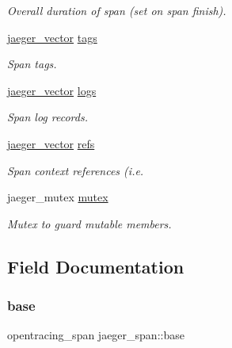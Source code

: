 \begin{DoxyCompactItemize}
\begin{DoxyCompactList}\small\item\em Overall duration of span (set on span finish). \end{DoxyCompactList}\item 
\mbox{\hyperlink{structjaeger__vector}{jaeger\+\_\+vector}} \mbox{\hyperlink{structjaeger__span_ae3812e107e701876ca824427ebdddbde}{tags}}
\begin{DoxyCompactList}\small\item\em Span tags. \end{DoxyCompactList}\item 
\mbox{\hyperlink{structjaeger__vector}{jaeger\+\_\+vector}} \mbox{\hyperlink{structjaeger__span_ab5b68679359d40f6821fffdbbb9cce01}{logs}}
\begin{DoxyCompactList}\small\item\em Span log records. \end{DoxyCompactList}\item 
\mbox{\hyperlink{structjaeger__vector}{jaeger\+\_\+vector}} \mbox{\hyperlink{structjaeger__span_a043c406e757c68b4c862d36d6b729cba}{refs}}
\begin{DoxyCompactList}\small\item\em Span context references (i.\+e. \end{DoxyCompactList}\item 
jaeger\+\_\+mutex \mbox{\hyperlink{structjaeger__span_a84d3f190ba0bb7106efdfe9d8e47beeb}{mutex}}
\begin{DoxyCompactList}\small\item\em Mutex to guard mutable members. \end{DoxyCompactList}\end{DoxyCompactItemize}


\subsection{Field Documentation}
\mbox{\label{structjaeger__span_a4d784dc9f217e068159cccc5f0f480e9}} 
\subsubsection{\texorpdfstring{base}{base}}
{\footnotesize\ttfamily opentracing\+\_\+span jaeger\+\_\+span\+::base}




